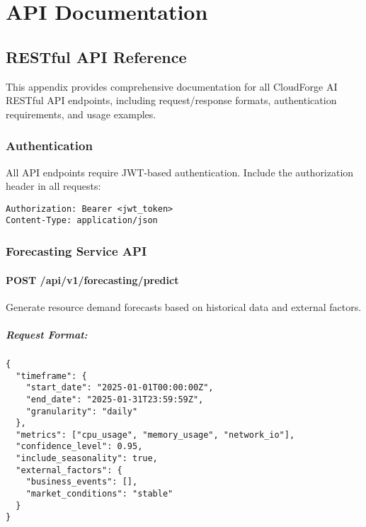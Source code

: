 \chapter{API Documentation}

\section{RESTful API Reference}

This appendix provides comprehensive documentation for all CloudForge AI RESTful API endpoints, including request/response formats, authentication requirements, and usage examples.

\subsection{Authentication}

All API endpoints require JWT-based authentication. Include the authorization header in all requests:

\begin{verbatim}
Authorization: Bearer <jwt_token>
Content-Type: application/json
\end{verbatim}

\subsection{Forecasting Service API}

\subsubsection{POST /api/v1/forecasting/predict}

Generate resource demand forecasts based on historical data and external factors.

\paragraph{Request Format:}
\begin{verbatim}
{
  "timeframe": {
    "start_date": "2025-01-01T00:00:00Z",
    "end_date": "2025-01-31T23:59:59Z",
    "granularity": "daily"
  },
  "metrics": ["cpu_usage", "memory_usage", "network_io"],
  "confidence_level": 0.95,
  "include_seasonality": true,
  "external_factors": {
    "business_events": [],
    "market_conditions": "stable"
  }
}
\end{verbatim}

